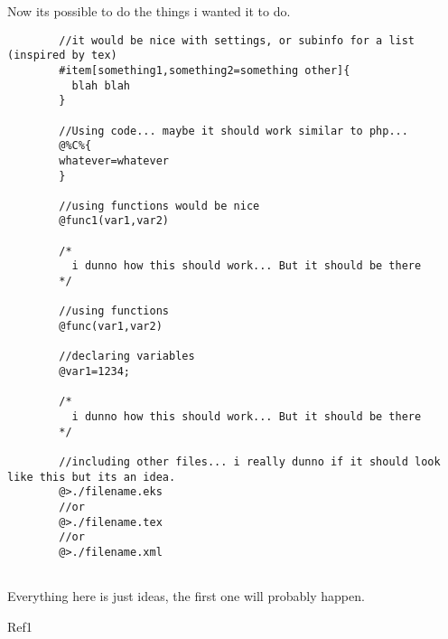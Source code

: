 \documentclass{book}
\begin{document}
	Now its possible to do the things i wanted it to do.
	
	\begin{verbatim}
		//it would be nice with settings, or subinfo for a list (inspired by tex)
		#item[something1,something2=something other]{
		  blah blah
		}
		
		//Using code... maybe it should work similar to php...
		@%C%{
		whatever=whatever
		}
		
		//using functions would be nice
		@func1(var1,var2)
		
		/*
		  i dunno how this should work... But it should be there
		*/
		
		//using functions
		@func(var1,var2)
		
		//declaring variables
		@var1=1234;
		
		/*
		  i dunno how this should work... But it should be there
		*/
		
		//including other files... i really dunno if it should look like this but its an idea.
		@>./filename.eks
		//or
		@>./filename.tex
		//or
		@>./filename.xml		
		
	\end{verbatim}
	
	Everything here is just ideas, the first one will probably happen.
	
	\begin{thebibliography}{1}
	
		Ref1
	
	\end{thebibliography}
	
	
\end{document}
